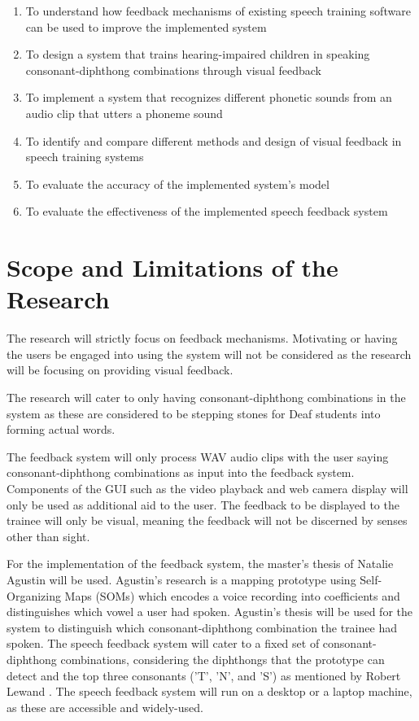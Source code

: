 \begin{enumerate}
\item To understand how feedback mechanisms of existing speech training software can be used to improve the implemented system
\item To design a system that trains hearing-impaired children in speaking consonant-diphthong combinations through visual feedback
\item To implement a system that recognizes different phonetic sounds from an audio clip that utters a phoneme sound
\item To identify and compare different methods and design of visual feedback in speech training systems
\item To evaluate the accuracy of the implemented system's model
\item To evaluate the effectiveness of the implemented speech feedback system
\end{enumerate}

\section{Scope and Limitations of the Research}
\label{sec:scopelimitations}

The research will strictly focus on feedback mechanisms. Motivating or having the users be engaged into using the system will not be considered as the research will be focusing on providing visual feedback.

The research will cater to only having consonant-diphthong combinations in the system as these are considered to be stepping stones for Deaf students into forming actual words.

The feedback system will only process WAV audio clips with the user saying consonant-diphthong combinations as input into the feedback system. Components of the GUI such as the video playback and web camera display will only be used as additional aid to the user. The feedback to be displayed to the trainee will only be visual, meaning the feedback will not be discerned by senses other than sight.

For the implementation of the feedback system, the master's thesis of Natalie Agustin \citeyear{agustin:2014:SOM} will be used. Agustin's research is a mapping prototype using Self-Organizing Maps (SOMs) which encodes a voice recording into coefficients and distinguishes which vowel a user had spoken. Agustin's thesis will be used for the system to distinguish which consonant-diphthong combination the trainee had spoken. The speech feedback system will cater to a fixed set of consonant-diphthong combinations, considering the diphthongs that the prototype can detect and the top three consonants ('T', 'N', and 'S') as mentioned by Robert Lewand \citeyear{lewand:2000:crymath}. The speech feedback system will run on a desktop or a laptop machine, as these are accessible and widely-used. 


